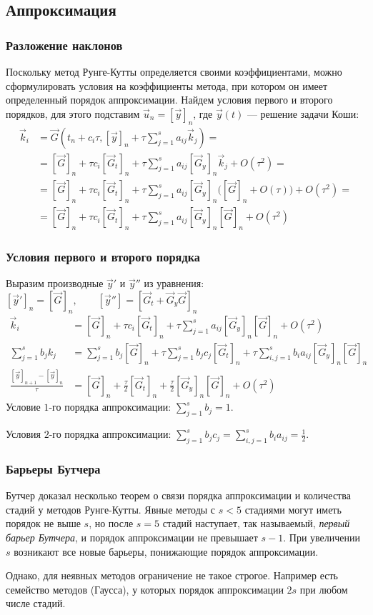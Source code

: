 \documentclass[professionalfonts,compress,unicode,aspectratio=169]{beamer}
\begin{document}
\subsection{Аппроксимация}
\begin{frame}\frametitle{Разложение наклонов}
	Поскольку метод Рунге-Кутты определяется своими коэффициентами, можно сформулировать условия на коэффициенты метода, при котором
	он имеет определенный порядок аппроксимации. Найдем условия первого и
второго порядков, для этого подставим $\vec u_n = [\vec y]_n$, где $\vec y(t)$ ---
	решение задачи Коши:
	\begin{align*}
	\vec k_i &= \vec G(t_n + c_i \tau, [\vec y]_n + \tau \sum\nolimits_{j=1}^s a_{ij}
\vec k_j) =\\
			&= [\vec G]_n + \tau c_i [\vec G_t]_n + \tau \sum\nolimits_{j=1}^s
a_{ij} [\vec G_y]_n \vec k_j + O(\tau^2) = \\
			&= [\vec G]_n + \tau c_i [\vec G_t]_n + \tau \sum\nolimits_{j=1}^s
a_{ij} [\vec G_y]_n \Big([\vec G]_n + O(\tau)\Big) + O(\tau^2) = \\
			&= [\vec G]_n + \tau c_i [\vec G_t]_n + \tau \sum\nolimits_{j=1}^s
a_{ij} [\vec G_y]_n [\vec G]_n + O(\tau^2)
	\end{align*}
\end{frame}

\begin{frame}\frametitle{Условия первого и второго порядка}
	Выразим производные $\vec y'$ и $\vec y''$ из уравнения:
	$
		[\vec y']_n = [\vec G]_n, \qquad [\vec y''] = [\vec G_t + \vec G_y \vec G]_n
	$
	\begin{align*}
	\vec k_i &= [\vec G]_n + \tau c_i [\vec G_t]_n + \tau \sum_{j=1}^s a_{ij}
[\vec G_y]_n [\vec G]_n + O(\tau^2)\\
	\sum_{j=1}^s b_j k_j &=
	\sum_{j=1}^s b_j [\vec G]_n + \tau \sum_{j=1}^s b_j c_j [\vec G_t]_n + \tau
\sum_{i,j=1}^s b_i a_{ij} [\vec G_y]_n[\vec G]_n \\
	\frac{[\vec y]_{n+1}-[\vec y]_n}{\tau} &= [\vec G]_n + \frac{\tau}{2}[\vec
G_t]_n + \frac{\tau}{2}[\vec G_y]_n [\vec G]_n + O(\tau^2)
	\end{align*}
	\pause
	Условие $1$-го порядка аппроксимации: $\displaystyle \sum_{j=1}^s b_j = 1$.

	Условия $2$-го порядка аппроксимации: $\displaystyle \sum_{j=1}^s b_j c_j = \sum_{i,j=1}^s b_i a_{ij} = \frac{1}{2}$.
\end{frame}

\begin{frame}\frametitle{Барьеры Бутчера}
	Бутчер доказал несколько теорем о связи порядка аппроксимации и количества стадий у методов Рунге-Кутты.
	Явные методы с $s<5$ стадиями могут иметь порядок не выше $s$, но после $s=5$ стадий наступает, так называемый,
	\emph{первый барьер Бутчера}, и порядок аппроксимации не превышает $s-1$. При увеличении $s$ возникают все новые барьеры, понижающие
	порядок аппроксимации.

	Однако, для неявных методов ограничение не такое строгое. Например есть семейство методов (Гаусса), у которых порядок аппроксимации $2s$ при любом числе стадий.
\end{frame}
\end{document}

